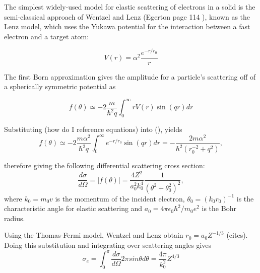 \documentclass [11pt, proquest, article] {uwthesis}[2016/11/22]
\begin{document}
The simplest widely-used model for elastic scattering of electrons in a solid is the semi-classical approach of Wentzel and Lenz (Egerton page 114 ), known as the Lenz model, which uses the Yukawa potential for the interaction between a fast electron and a target atom:

\begin{equation}
	V(r) = \alpha^2 \frac{e^{-r/r_0}}{r}
\end{equation}


The first Born approximation gives the amplitude for a particle's scattering off of a spherically symmetric potential as

\begin{equation}
	f(\theta) \simeq -2 \frac{m}{\hbar^2 q} \int_0^\infty r V(r) \sin (qr) dr
\end{equation}

Substituting (how do I reference equations) into (), yields 
\begin{equation}
	f(\theta) \simeq -2 \frac{m \alpha^2}{\hbar^2 q} \int_0^\infty e^{-r/r_0} \sin (qr) dr = -\frac{2m\alpha^2}{\hbar^2 (r_0^{-2} + q^2)},
\end{equation}

therefore giving the following differential scattering cross section:
$$
\frac{d\sigma}{d\Omega} = |f(\theta)| = \frac{4 Z^2}{a_0^2 k_0^4} \frac{1}{(\theta^2 + \theta_0^2)^2},
$$
where $k_0 = m_0 v$ is the momentum of the incident electron, $\theta_0 = (k_0 r_0)^{-1}$ is the characteristic angle for elastic scattering and $a_0 = 4 \pi \epsilon_0 \hbar^2/m_0 e^2$ is the Bohr radius.

Using the Thomas-Fermi model, Wentzel and Lenz obtain $r_0 = a_0 Z^{-1/3}$ (cites). Doing this substitution and integrating over scattering angles gives
\begin{equation}
\sigma_e = \int_0^\pi \frac{d\sigma}{d\Omega} 2 \pi sin \theta d \theta = \frac{4 \pi}{k_0^2} Z^{4/3}
\end{equation}
\end{document}
